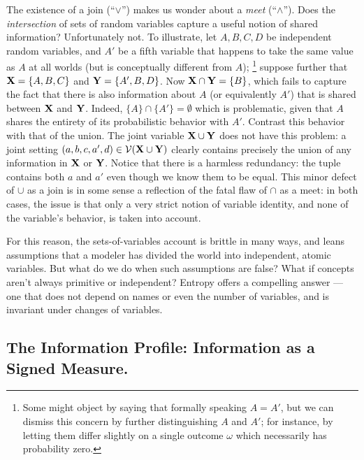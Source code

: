 \documentclass[the-pdg-manual.tex]{subfiles}
\begin{document}
    The existence of a join (``$\lor$'') makes us wonder about a \emph{meet} (``$\land$''). Does the \emph{intersection} of sets of random variables capture a useful notion of shared information? Unfortunately not.
    To illustrate, let $A, B, C, D$ be independent random variables, and $A'$ be a fifth variable that happens to take the same value as $A$ at all worlds (but is conceptually different from $A$);%
        \footnote{Some might object by saying that formally speaking $A = A'$, but we can dismiss this concern by further distinguishing $A$ and $A'$; for instance, by letting them differ slightly on a single outcome $\omega$ which necessarily has probability zero.}
    suppose further that $\mathbf X = \{A,B,C\}$ and $\mathbf Y = \{A', B, D\}$. Now $\mathbf X \cap \mathbf Y = \{B\}$, which fails to capture the fact that there is also information about $A$ (or equivalently $A'$) that is shared between $\mathbf X$ and $\mathbf Y$. Indeed, $\{A\} \cap \{A'\} = \emptyset$ which is problematic, given that $A$ shares the entirety of its probabilistic behavior with $A'$.
    Contrast this behavior with that of the union.  The joint variable $\mathbf X \cup \mathbf Y$ does not have this problem: a joint setting $(a,b,c,a',d) \in \mathcal V(\mathbf X \cup \mathbf Y)$ clearly contains precisely the union of any information in $\mathbf X$ or $\mathbf Y$. Notice that there is a harmless redundancy: the tuple contains both $a$ and $a'$ even though we know them to be equal. This minor defect of $\cup$ as a join is in some sense a reflection of the fatal flaw of $\cap$ as a meet: in both cases, the issue is that only a very strict notion of variable identity, and none of the variable's behavior, is taken into account.

    For this reason, the sets-of-variables account is brittle in many ways, and leans assumptions that a modeler has divided the world into independent, atomic variables. But what do we do when such assumptions are false? What if concepts aren't always primitive or independent? Entropy offers a compelling answer --- one that does not depend on names or even the number of variables, and is invariant under changes of variables.

    \subsection{The Information Profile: Information as a Signed Measure.}






\end{document}
